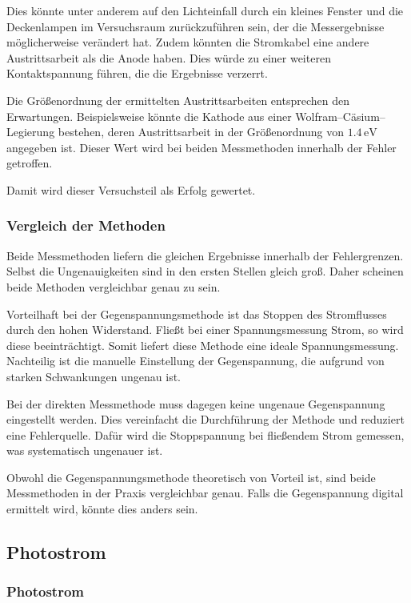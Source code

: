 \documentclass[12pt,a4paper]{scrartcl}
\numberwithin{equation}{section} %
\begin{document}
Dies könnte unter anderem auf den Lichteinfall durch ein kleines Fenster und die Deckenlampen im Versuchsraum zurückzuführen sein, der die Messergebnisse möglicherweise verändert hat. Zudem könnten die Stromkabel eine andere Austrittsarbeit als die Anode haben. Dies würde zu einer weiteren Kontaktspannung führen, die die Ergebnisse verzerrt.

Die Größenordnung der ermittelten Austrittsarbeiten entsprechen den Erwartungen. Beispielsweise könnte die Kathode aus einer Wolfram--Cäsium--Legierung bestehen, deren Austrittsarbeit in der Größenordnung von $1.4\mathrm{\,eV}$ \cite{Demtröder} angegeben ist. Dieser Wert wird bei beiden Messmethoden innerhalb der Fehler getroffen.

Damit wird dieser Versuchsteil als Erfolg gewertet.

\subsubsection{Vergleich der Methoden}
Beide Messmethoden liefern die gleichen Ergebnisse innerhalb der Fehlergrenzen. Selbst die Ungenauigkeiten sind in den ersten Stellen gleich groß. Daher scheinen beide Methoden vergleichbar genau zu sein.

Vorteilhaft bei der Gegenspannungsmethode ist das Stoppen des Stromflusses durch den hohen Widerstand. Fließt bei einer Spannungsmessung Strom, so wird diese beeinträchtigt. Somit liefert diese Methode eine ideale Spannungsmessung. Nachteilig ist die manuelle Einstellung der Gegenspannung, die aufgrund von starken Schwankungen ungenau ist.

Bei der direkten Messmethode muss dagegen keine ungenaue Gegenspannung eingestellt werden. Dies vereinfacht die Durchführung der Methode und reduziert eine Fehlerquelle. Dafür wird die Stoppspannung bei fließendem Strom gemessen, was systematisch ungenauer ist.

Obwohl die Gegenspannungsmethode theoretisch von Vorteil ist, sind beide Messmethoden in der Praxis vergleichbar genau. Falls die Gegenspannung digital ermittelt wird, könnte dies anders sein.

\subsection{Photostrom}
\subsubsection{Photostrom}
\end{document}
